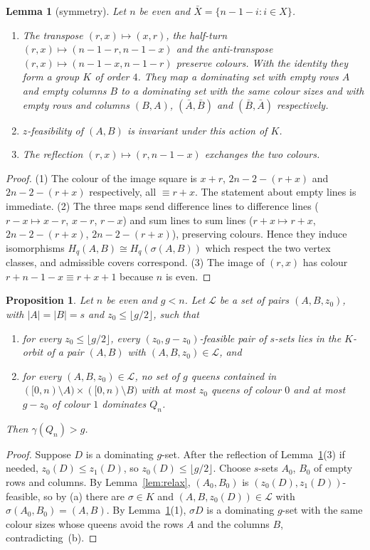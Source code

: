 \documentclass[11pt]{article}
\newtheorem{proposition}[theorem]{Proposition}
\newtheorem{lemma}[theorem]{Lemma}
\theoremstyle{definition}
\theoremstyle{remark}
\begin{document}
\begin{lemma}[symmetry]\label{lem:sym}
Let $n$ be even and $\bar X=\{n-1-i:i\in X\}$.
\begin{enumerate}
\item The transpose $(r,x)\mapsto(x,r)$, the half-turn $(r,x)\mapsto(n-1-r,n-1-x)$ and the anti-transpose
$(r,x)\mapsto(n-1-x,n-1-r)$ preserve colours. With the identity they form a group $K$ of order $4$. They
map a dominating set with empty rows $A$ and empty columns $B$ to a dominating set with the same colour
sizes and with empty rows and columns $(B,A)$, $(\bar A,\bar B)$ and $(\bar B,\bar A)$ respectively.
\item $z$-feasibility of $(A,B)$ is invariant under this action of $K$.
\item The reflection $(r,x)\mapsto(r,n-1-x)$ exchanges the two colours.
\end{enumerate}
\end{lemma}
\begin{proof}
(1) The colour of the image square is $x+r$, $2n-2-(r+x)$ and $2n-2-(r+x)$ respectively, all
$\equiv r+x$. The statement about empty lines is immediate. (2) The three maps send difference lines to
difference lines ($r-x\mapsto x-r$, $x-r$, $r-x$) and sum lines to sum lines ($r+x\mapsto r+x$,
$2n-2-(r+x)$, $2n-2-(r+x)$), preserving colours. Hence they induce isomorphisms $H_q(A,B)\cong
H_q(\sigma(A,B))$ which respect the two vertex classes, and admissible covers correspond. (3) The image
of $(r,x)$ has colour $r+n-1-x\equiv r+x+1$ because $n$ is even.
\end{proof}

\begin{proposition}\label{prop:complete}
Let $n$ be even and $g<n$. Let $\mathcal L$ be a set of pairs $(A,B,z_0)$, with $|A|=|B|=s$ and
$z_0\le\lfloor g/2\rfloor$, such that
\begin{enumerate}
\item[(a)] for every $z_0\le\lfloor g/2\rfloor$, every $(z_0,g-z_0)$-feasible pair of $s$-sets lies in
the $K$-orbit of a pair $(A,B)$ with $(A,B,z_0)\in\mathcal L$, and
\item[(b)] for every $(A,B,z_0)\in\mathcal L$, no set of $g$ queens contained in
$([0,n)\setminus A)\times([0,n)\setminus B)$ with at most $z_0$ queens of colour $0$ and at most
$g-z_0$ of colour $1$ dominates $Q_n$.
\end{enumerate}
Then $\gamma(Q_n)>g$.
\end{proposition}
\begin{proof}
Suppose $D$ is a dominating $g$-set. After the reflection of Lemma~\ref{lem:sym}(3) if needed,
$z_0(D)\le z_1(D)$, so $z_0(D)\le\lfloor g/2\rfloor$. Choose $s$-sets $A_0$, $B_0$ of empty rows and
columns. By Lemma~\ref{lem:relax}, $(A_0,B_0)$ is $(z_0(D),z_1(D))$-feasible, so by (a) there are
$\sigma\in K$ and $(A,B,z_0(D))\in\mathcal L$ with $\sigma(A_0,B_0)=(A,B)$. By Lemma~\ref{lem:sym}(1),
$\sigma D$ is a dominating $g$-set with the same colour sizes whose queens avoid the rows $A$ and the
columns $B$, contradicting~(b).
\end{proof}
\end{document}
